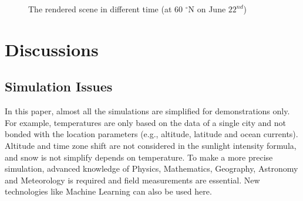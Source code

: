 \documentclass{article}
\begin{document}
\begin{figure}[h]
  \hfill
  \hfill

  \caption{The rendered scene in different time (at 60 $^{\circ}$N on June \(22^{nd}\))}
  \label{fig:L60N}
\end{figure}

\section{Discussions}

\subsection {Simulation Issues}
In this paper, almost all the simulations are simplified for demonstrations only. For example, temperatures are only based on the data
of a single city and not bonded with the location parameters (e.g., altitude, latitude and ocean currents). Altitude and time zone
shift are not considered in the sunlight intensity formula, and snow is not simplify depends on temperature. To make a more precise
simulation, advanced knowledge of Physics, Mathematics, Geography, Astronomy and Meteorology is required and field measurements are
essential. New technologies like Machine Learning can also be used here.
\end{document}

